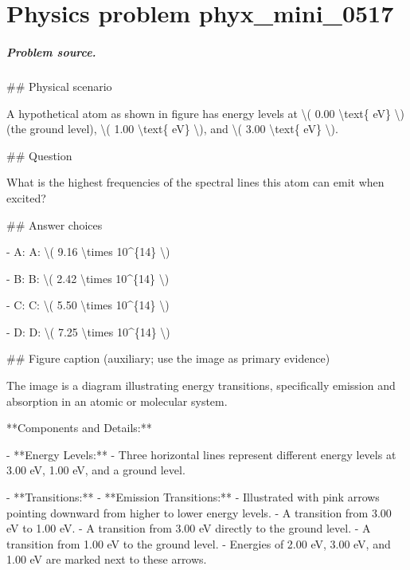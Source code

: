 
\chapter{Physics problem phyx\_mini\_0517}
\label{ch:PhyXMiniProblems_problem_phyx_mini_0517}

\paragraph{Problem source.}
\#\# Physical scenario

A hypothetical atom as shown in figure has energy levels at \textbackslash{}( 0.00 \textbackslash{}text\{ eV\} \textbackslash{}) (the ground level), \textbackslash{}( 1.00 \textbackslash{}text\{ eV\} \textbackslash{}), and \textbackslash{}( 3.00 \textbackslash{}text\{ eV\} \textbackslash{}).

\#\# Question

What is the highest frequencies of the spectral lines this atom can emit when excited?

\#\# Answer choices

- A: A: \textbackslash{}( 9.16 \textbackslash{}times 10\textasciicircum{}\{14\} \textbackslash{})

- B: B: \textbackslash{}( 2.42 \textbackslash{}times 10\textasciicircum{}\{14\} \textbackslash{})

- C: C: \textbackslash{}( 5.50 \textbackslash{}times 10\textasciicircum{}\{14\} \textbackslash{})

- D: D: \textbackslash{}( 7.25 \textbackslash{}times 10\textasciicircum{}\{14\} \textbackslash{})

\#\# Figure caption (auxiliary; use the image as primary evidence)

The image is a diagram illustrating energy transitions, specifically emission and absorption in an atomic or molecular system. 

**Components and Details:**

- **Energy Levels:**
  - Three horizontal lines represent different energy levels at 3.00 eV, 1.00 eV, and a ground level.

- **Transitions:**
  - **Emission Transitions:**
    - Illustrated with pink arrows pointing downward from higher to lower energy levels. 
    - A transition from 3.00 eV to 1.00 eV.
    - A transition from 3.00 eV directly to the ground level.
    - A transition from 1.00 eV to the ground level.
    - Energies of 2.00 eV, 3.00 eV, and 1.00 eV are marked next to these arrows.

